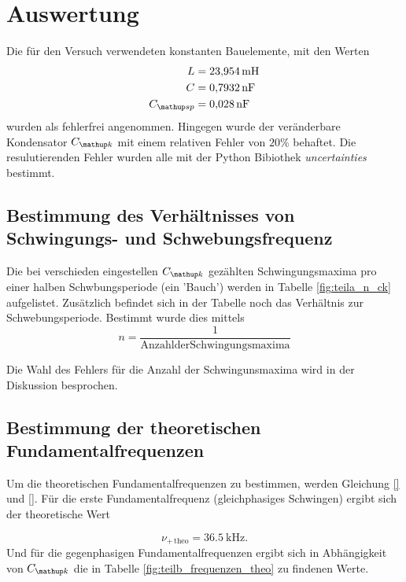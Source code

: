 \section{Auswertung}
Die für den Versuch verwendeten konstanten Bauelemente, mit den Werten
\begin{align}
\label{eq:bau}
\begin{aligned}
L&=\SI{23.954}{\milli\henry}\\
C&=\SI{0.7932}{\nano\farad}\\
C\ua{sp}&=\SI{0.028}{\nano\farad}
\end{aligned}
\end{align}
wurden als fehlerfrei angenommen.
Hingegen wurde der veränderbare Kondensator $C\ua{k}$ mit
einem relativen Fehler von $20\%$ behaftet.
Die resulutierenden Fehler wurden alle mit der Python Bibiothek 
\emph{uncertainties} bestimmt.

\subsection{Bestimmung des Verhältnisses von Schwingungs- und Schwebungsfrequenz}
Die bei verschieden eingestellen $C\ua{k}$ gezählten Schwingungsmaxima pro einer halben
Schwbungsperiode (ein 'Bauch') werden in Tabelle \ref{fig:teila_n_ck} aufgelistet.
Zusätzlich befindet sich in der Tabelle noch das Verhältnis zur Schwebungsperiode.
Bestimmt wurde dies mittels
\begin{equation*}
n=\frac{1}{\mathup{Anzahl der Schwingungsmaxima}}
\end{equation*}

Die Wahl des Fehlers für die Anzahl der Schwingunsmaxima wird in der Diskussion besprochen.


\subsection{Bestimmung der theoretischen Fundamentalfrequenzen}
Um die theoretischen Fundamentalfrequenzen zu bestimmen, werden Gleichung \eqref{} und 
\eqref{}.
Für die erste Fundamentalfrequenz (gleichphasiges Schwingen) ergibt sich der 
theoretische Wert

\begin{equation}
\label{eq:nu_plu_theo}
\nu_{+\,\mathup{theo}}=\SI{36,5}{\kilo\hertz}.
\end{equation}
Und für die gegenphasigen Fundamentalfrequenzen ergibt sich in Abhängigkeit von $C\ua{k}$ die in Tabelle \ref{fig:teilb_frequenzen_theo} zu findenen Werte. 


